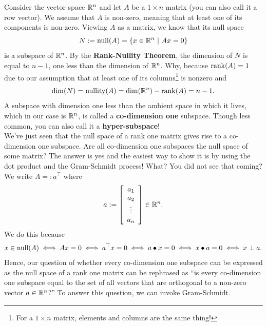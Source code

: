 Consider the vector space $\mathbb R^n$ and let $A$ be a $1 \times n$ matrix (you can also call it a row vector). We assume that $A$ is non-zero, meaning that at least one of its components is non-zero. Viewing $A$ as a matrix, we know that its null space 
$$N:=\mathrm{null}(A)=\{ x \in \mathbb R^n~|~Ax = 0 \} $$
is a subspace of $\mathbb R^n$. By the \textbf{Rank-Nullity Theorem}, the dimension of $N$ is equal to $n-1$, one less than the dimension of $\mathbb R^n$. Why, because $\mathrm{rank}(A)=1$ due to our assumption that at least one of its columns\footnote{For a $1 \times n$ matrix, elements and columns are the same thing!} is nonzero and
$$\dim(N) = \mathrm{nullity}(A) = \dim(\mathbb R^n) -\mathrm{rank}(A) = n -1. $$
A subspace with dimension one less than the ambient space in which it lives, which in our case is $\mathbb R^n$, is called a \textbf{co-dimension one} subspace. Though less common, you can also call it a \textbf{hyper-subspace}! \\

We've just seen that the null space of a rank one matrix gives rise to a co-dimension one subspace. Are all co-dimension one subspaces the null space of some matrix? The answer is yes and the easiest way to show it is by using the dot product and the Gram-Schmidt process! What? You did not see that coming? \\

We write $A=: a^\top$ where 
$$a:=\left[ \begin{array}{c} a_1 \\ a_2 \\ \vdots \\ a_n   \end{array} \right] \in \mathbb R^n .$$
We do this because 
$$ x \in \mathrm{null}(A) \iff Ax=0 \iff  a^\top x =0 \iff  a \bullet x = 0 \iff  x \bullet a =0 \iff  x \perp a.  $$
Hence, our question of whether every co-dimension one subspace can be expressed as the null space of a rank one matrix can be rephrased as ``is every co-dimension one subspace equal to the set of all vectors that are orthogonal to a non-zero vector $a\in \mathbb R^n$?'' To answer this question, we can invoke Gram-Schmidt. \\

